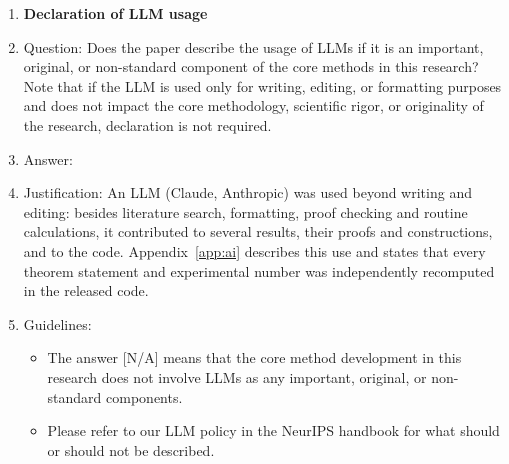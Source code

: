\begin{enumerate}
\item {\bf Declaration of LLM usage}
    \item[] Question: Does the paper describe the usage of LLMs if it is an important, original, or non-standard component of the core methods in this research? Note that if the LLM is used only for writing, editing, or formatting purposes and does not impact the core methodology, scientific rigor, or originality of the research, declaration is not required.
    \item[] Answer: \answerYes{}
    \item[] Justification: An LLM (Claude, Anthropic) was used beyond writing and editing: besides literature search, formatting, proof checking and routine calculations, it contributed to several results, their proofs and constructions, and to the code. Appendix~\ref{app:ai} describes this use and states that every theorem statement and experimental number was independently recomputed in the released code.
    \item[] Guidelines:
    \begin{itemize}
        \item The answer [N/A] means that the core method development in this research does not involve LLMs as any important, original, or non-standard components.
        \item Please refer to our LLM policy in the NeurIPS handbook for what should or should not be described.
    \end{itemize}

\end{enumerate}
